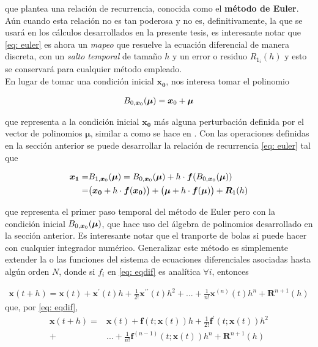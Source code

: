 que plantea una relación de recurrencia, conocida como el \textbf{método de Euler}. Aún cuando esta relación no es tan poderosa y no es, definitivamente, la que se usará en los cálculos desarrollados en la presente tesis, es interesante notar que \ref{eq: euler} es ahora un \textit{mapeo} que resuelve la ecuación diferencial de manera discreta, con un \textit{salto temporal} de tamaño $h$ y un error o residuo $R_{1_i}(h)$ y esto se conservará para cualquier método empleado.\\

En lugar de tomar una condición inicial $\bm{x_0}$, nos interesa tomar el polinomio

\begin{align*}
 B_{0,\bm{x}_0}(\bm{\mu}) = \bm{x}_0 + \bm{\mu}
\end{align*}

que representa a la condición inicial $\bm{x_0}$ más alguna perturbación definida  por el vector de polinomios $\bm{\mu}$, similar a como se hace en \cite{Perez2015}. Con las operaciones definidas en la sección anterior se puede desarrollar la relación de recurrencia \ref{eq: euler} tal que 

\begin{align*}
 \bm{x_1} =&  B_{1,\bm{x}_0}(\bm{\mu}) =  B_{0,\bm{x}_0}(\bm{\mu}) + h\cdot\bm{f}( B_{0,\bm{x}_0}(\bm{\mu})) \\ 
 =& \big( \bm{x_0} + h\cdot \bm{f}(\bm{x_0}) \big) +  \big( \bm{\mu} + h\cdot \bm{f}(\bm{\mu}) \big) + \bm{R}_1(h)
\end{align*}

que representa el primer paso temporal del método de Euler pero con la condición inicial $B_{0,\bm{x}_0}(\bm{\mu})$, que hace uso del álgebra de polinomios desarrollado en la sección anterior. Es interesante notar que el tranporte de bolas si puede hacer con cualquier integrador numérico. Generalizar este método es simplemente extender la o las funciones del sistema de ecuaciones diferenciales asociadas hasta algún orden $N$, donde si $f_i$ en \ref{eq: eqdif} es analítica $\forall i$, entonces 

\begin{align}
 \bm{x}(t+h) = \bm{x}(t) + \bm{x}^{\prime}(t)h + \frac{1}{2!}\bm{x}^{\prime\prime}(t)h^2 + ... + \frac{1}{n!}\bm{x}^{(n)}(t)h^n + \bm{R}^{n+1}(h)
\end{align}
que, por \ref{eq: eqdif},
\begin{align}
 \bm{x}(t+h) =& \bm{x}(t) + \bm{f}(t;\bm{x}(t))h + \frac{1}{2!}\bm{f}^\prime(t;\bm{x}(t))h^2 \\ 
 +& ... + \frac{1}{n!}\bm{f}^{(n-1)}(t;\bm{x}(t))h^n + \bm{R}^{n+1}(h)
 \label{eq: taylorint}
\end{align}

